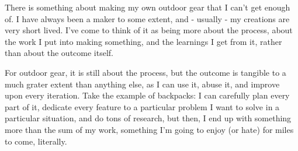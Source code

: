 There is something about making my own outdoor gear that I can't get enough of. I have always been a maker to some extent, and - usually - my creations are very short lived. I've come to think of it as being more about the process, about the work I put into making something, and the learnings I get from it, rather than about the outcome itself.

For outdoor gear, it is still about the process, but the outcome is tangible to a much grater extent than anything else, as I can use it, abuse it, and improve upon every iteration. Take the example of backpacks: I can carefully plan every part of it, dedicate every feature to a particular problem I want to solve in a particular situation, and do tons of research, but then, I end up with something more than the sum of my work, something I'm going to enjoy (or hate) for miles to come, literally.
